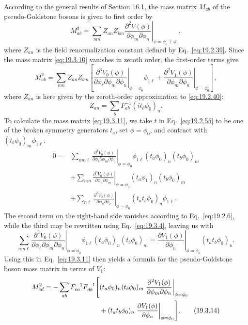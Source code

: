 According to the general results of Section 16.1, the mass matrix $M_{ab}$ of the pseudo-Goldstone bosons is given to first order by
\begin{equation}
M_{ab}^2=\left.\sum_{mn}Z_{an}Z_{bm}
\frac{\partial^2 V(\phi)}{\partial\phi_m\partial\phi_n}
\right|_{\phi=\phi_0+\phi_1},
\tag{19.3.10}\label{eq:19.3.10}
\end{equation}
where $Z_{an}$ is the field renormalization constant defined by Eq.~\eqref{eq:19.2.39}. Since the mass matrix \eqref{eq:19.3.10} vanishes in zeroth order, the first-order terms give
\begin{equation}
M_{ab}^2=\sum_{mn}Z_{an}Z_{bm}
\left[
\left.\frac{\partial^3 V_0(\phi)}
{\partial\phi_\ell\partial\phi_m\partial\phi_n}
\right|_{\phi=\phi_0}\phi_{1\ell}
+\left.\frac{\partial^2 V_1(\phi)}
{\partial\phi_m\partial\phi_n}\right|_{\phi=\phi_0}
\right],
\tag{19.3.11}\label{eq:19.3.11}
\end{equation}
where $Z_{an}$ is here given by the zeroth-order approximation to \eqref{eq:19.2.40}:
\begin{equation}
Z_{an}=\sum_b F_{ab}^{-1}(it_b\phi_0)_n.
\tag{19.3.12}\label{eq:19.3.12}
\end{equation}
To calculate the mass matrix \eqref{eq:19.3.11}, we take $t$ in Eq.~\eqref{eq:19.2.55} to be one of the broken symmetry generators $t_a$, set $\phi=\phi_0$, and contract with $(t_b\phi_0)_m\phi_{1\ell}$:
\begin{align*}
0={}&
\left.\sum_{nm\ell}
\frac{\partial^3 V_0(\phi)}
{\partial\phi_\ell\partial\phi_m\partial\phi_n}
\right|_{\phi=\phi_0}
\phi_{1\ell}(t_a\phi_0)_n(t_b\phi_0)_m
\\
&+\left.\sum_{nm}
\frac{\partial^2 V_0(\phi)}
{\partial\phi_n\partial\phi_m}
\right|_{\phi=\phi_0}
(t_a\phi_1)_n(t_b\phi_0)_m
\\
&+\left.\sum_{n\ell}
\frac{\partial^2 V_0(\phi)}
{\partial\phi_n\partial\phi_\ell}
\right|_{\phi=\phi_0}
(t_at_b\phi_0)_n\phi_{1\ell}.
\end{align*}
The second term on the right-hand side vanishes according to Eq.~\eqref{eq:19.2.6}, while the third may be rewritten using Eq.~\eqref{eq:19.3.4}, leaving us with
\begin{equation}
\left.\sum_{nm\ell}
\frac{\partial^3 V_0(\phi)}
{\partial\phi_\ell\partial\phi_m\partial\phi_n}
\right|_{\phi=\phi_0}
\phi_{1\ell}(t_a\phi_0)_n(t_b\phi_0)_m
=
\left.\frac{\partial V_1(\phi)}{\partial\phi_n}
\right|_{\phi=\phi_0}
(t_at_b\phi_0)_n.
\tag{19.3.13}\label{eq:19.3.13}
\end{equation}
Using this in Eq.~\eqref{eq:19.3.11} then yields a formula for the pseudo-Goldstone boson mass matrix in terms of $V_1$:
\begin{align}
M_{cd}^2=-\sum_{ab}F_{ca}^{-1}F_{db}^{-1}
\Biggl[
&(t_a\phi_0)_n(t_b\phi_0)_m
\left.\frac{\partial^2 V_1(\phi)}
{\partial\phi_m\partial\phi_n}\right|_{\phi=\phi_0}
\notag\\
&+(t_at_b\phi_0)_n
\left.\frac{\partial V_1(\phi)}{\partial\phi_n}
\right|_{\phi=\phi_0}
\Biggr].
\tag{19.3.14}\label{eq:19.3.14}
\end{align}

